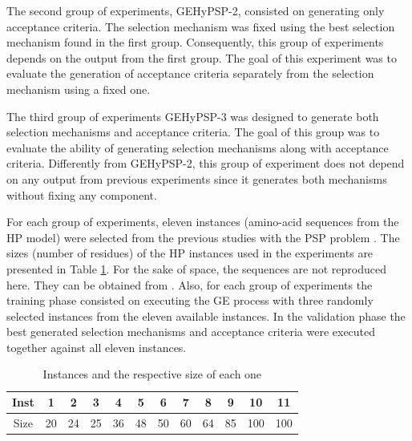 \documentclass[conference]{IEEEtran}
\begin{document}
The second group of experiments, GEHyPSP-2, consisted on  generating only acceptance criteria. The selection mechanism was fixed using the best selection mechanism found in the first group. Consequently, this group of experiments depends on the output from the first group. The goal of this experiment was to evaluate the generation of acceptance criteria separately from the selection mechanism using a fixed one.



The third group of experiments GEHyPSP-3 was designed to  generate both selection mechanisms and acceptance criteria. The goal of this group was to evaluate the ability of generating selection mechanisms along with acceptance criteria. Differently from GEHyPSP-2, this group of experiment does not depend on any output from previous experiments since it generates both mechanisms without fixing any component.



For each group of experiments, eleven instances (amino-acid sequences from the HP model) were selected from the previous studies with the PSP problem \cite{custodio2004investigation,lin2011protein,santana2008component,custodio2014multiple}. The sizes (number of residues) of the HP instances used in the experiments are presented in Table \ref{tab:instances}. 
 For the sake of space, the sequences are not reproduced here. They can be obtained from \cite{santana2008component}. Also, for each group of experiments the training phase consisted on executing the GE process with three randomly selected instances from the eleven available instances. In the validation phase the best generated selection mechanisms and acceptance criteria were executed together against all eleven instances. 

\begin{table}[]
	\centering
	\caption{Instances and the respective size of each one}
	\label{tab:instances}
	\begin{tabular}{cccccccccccc}
		Inst & 1 & 2 & 3 & 4 & 5 & 6 & 7 & 8 & 9 & 10 & 11 \\ \hline
		Size & 20 & 24 & 25 & 36 & 48 & 50 & 60 & 64 & 85 & 100 & 100 \\ \hline
	\end{tabular}
\end{table}
\end{document}

